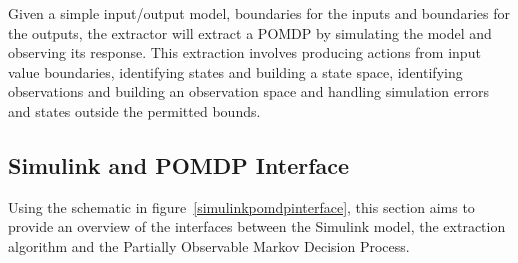 Given a simple input/output model, boundaries for the inputs and boundaries for the outputs, the extractor will extract a POMDP by simulating the model and observing its response. This extraction involves producing actions from input value boundaries, identifying states and building a state space, identifying observations and building an observation space and handling simulation errors and states outside the permitted bounds.

\subsection{Simulink and POMDP Interface}
\label{subsec:extractoveriew}

Using the schematic in figure~\ref{simulinkpomdpinterface}, this section aims to provide an overview of the interfaces between the Simulink model, the extraction algorithm and the Partially Observable Markov Decision Process.

